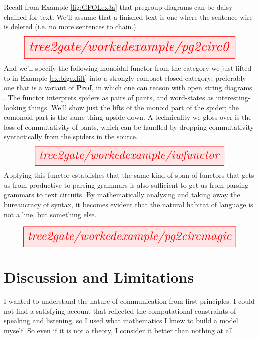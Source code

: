 \begin{myboxR}
\begin{example}
Recall from Example \ref{fig:GFOLex3a} that pregroup diagrams can be daisy-chained for text. We'll assume that a finished text is one where the sentence-wire is deleted (i.e. no more sentences to chain.)
\[\resizebox{0.95\textwidth}{!}{\tikzfig{tree2gate/workedexample/pg2circ0}}\]
And we'll specify the following monoidal functor from the category we just lifted to in Example \ref{ex:bigexlift} into a strongly compact closed category; preferably one that is a variant of \textbf{Prof}, in which one can reason with open string diagrams \citep{huExternalTracedMonoidala,romanOpenDiagramsCoend2021a}. The functor interprets spiders as pairs of pants, and word-states as interesting-looking things. We'll show just the lifts of the monoid part of the spider; the comonoid part is the same thing upside down. A technicality we gloss over is the loss of commutativity of pants, which can be handled by dropping commutativity syntactically from the spiders in the source.
\[\resizebox{0.85\textwidth}{!}{\tikzfig{tree2gate/workedexample/iwfunctor}}\]
Applying this functor establishes that the same kind of span of functors that gets us from productive to parsing grammars is also sufficient to get us from parsing grammars to text circuits. By mathematically analysing and taking away the bureaucracy of syntax, it becomes evident that the natural habitat of language is not a line, but something else.
\end{example}
\end{myboxR}

\begin{myboxR}
\[\resizebox{0.95\textwidth}{!}{\tikzfig{tree2gate/workedexample/pg2circmagic}}\]
\end{myboxR}

\clearpage

\section{Discussion and Limitations}


I wanted to understand the nature of communication from first principles. I could not find a satisfying account that reflected the computational constraints of speaking and listening, so I used what mathematics I knew to build a model myself. So even if it is not a theory, I consider it better than nothing at all.\\

